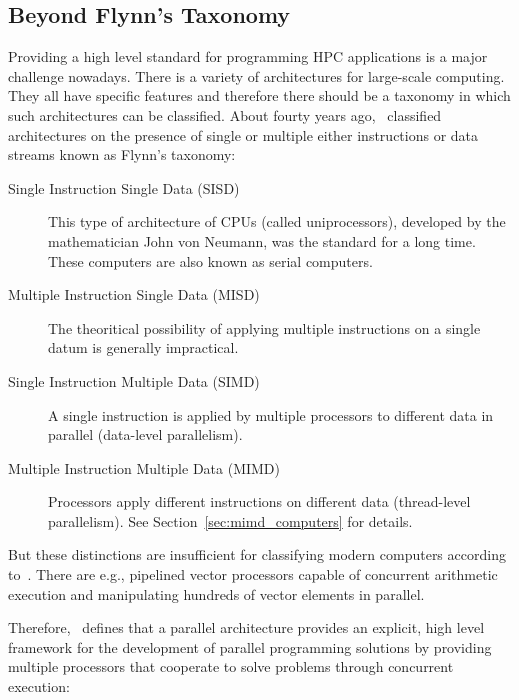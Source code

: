 \subsection{Beyond Flynn's Taxonomy}
\label{sec:flynn}
Providing a high level standard for programming HPC applications is a
major challenge nowadays. There is a variety of architectures for
large-scale computing. They all have specific features and 
therefore there should be a taxonomy in which such architectures can
be classified. About fourty years ago, \cite{flynn72sco}~classified
architectures on the
presence of single or multiple either instructions or data streams
known as Flynn's taxonomy:
\begin{description}
\item[Single Instruction Single Data (SISD)]
  This type of architecture of CPUs (called uniprocessors),
  developed by the 
  mathematician John von Neumann, was the standard for a long
  time. These computers are also known as serial computers. 
\item[Multiple Instruction Single Data (MISD)] The theoritical possibility
  of applying multiple instructions on a single datum is generally
  impractical.
\item[Single Instruction Multiple Data (SIMD)] 
  A single instruction is applied by multiple processors to different
  data in parallel (data-level parallelism). 
\item[Multiple Instruction Multiple Data (MIMD)] Processors apply
  different instructions on different data (thread-level
  parallelism). See Section~\ref{sec:mimd_computers} for details. 
\end{description}

But these distinctions are insufficient for classifying modern
computers according to~\cite{duncan90survey}. There are e.g.,
pipelined vector processors capable of concurrent arithmetic execution and
manipulating hundreds of vector elements in parallel.

Therefore,~\cite{duncan90survey} defines that a parallel architecture
provides an explicit, high level framework for 
the development of parallel programming solutions by providing
multiple processors that cooperate to solve problems through
concurrent execution:

